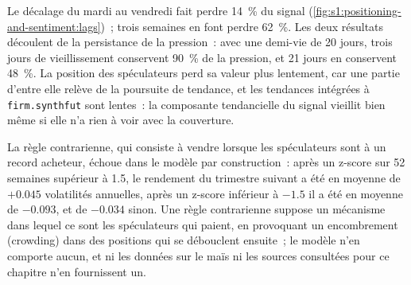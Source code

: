 Le décalage du mardi au vendredi fait perdre 14~\% du signal (\cref{fig:s1:positioning-and-sentiment:lags})~; trois semaines en font perdre 62~\%. Les deux résultats découlent de la
persistance de la pression~: avec une demi-vie de 20 jours, trois jours de vieillissement conservent 90~\% de la pression, et 21 jours en conservent 48~\%. La position des spéculateurs perd sa valeur plus
lentement, car une partie d'entre elle relève de la poursuite de tendance, et les tendances intégrées à \texttt{firm.synthfut} sont lentes~: la composante tendancielle du signal vieillit bien
même si elle n'a rien à voir avec la couverture.

\begin{omfigure}

\label{fig:s1:positioning-and-sentiment:lags}
\end{omfigure}

La règle contrarienne, qui consiste à vendre lorsque les spéculateurs sont à un record acheteur, échoue dans le modèle par construction~: après un z-score sur 52 semaines supérieur à 1.5, le rendement du trimestre suivant
a été en moyenne de $+0.045$ volatilités annuelles, après un z-score inférieur à $-1.5$ il a été en moyenne de $-0.093$, et de $-0.034$ sinon. Une règle contrarienne suppose un
mécanisme dans lequel ce sont les spéculateurs qui paient, en provoquant un encombrement (crowding) dans des positions qui se débouclent ensuite~; le modèle n'en comporte aucun, et ni les données sur le maïs ni les
sources consultées pour ce chapitre n'en fournissent un.

